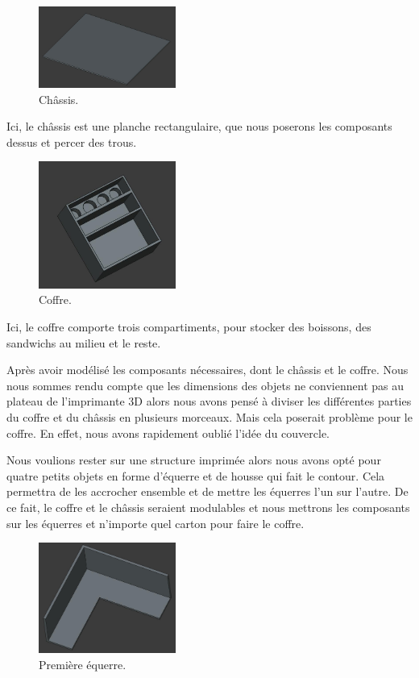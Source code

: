 \documentclass[a4paper,12pt]{report}  %
\begin{document}
\begin{figure}[H]
	\centering
	\includegraphics[width=0.4\textwidth]{./attachments/cad_planche.jpg}
	\caption{Châssis.}
\end{figure}

Ici, le châssis est une planche rectangulaire, que nous poserons les composants dessus et percer des trous.

\begin{figure}[H]
	\centering
	\includegraphics[width=0.4\textwidth]{./attachments/cad_coffre.jpg}
	\caption{Coffre.}
\end{figure}

Ici, le coffre comporte trois compartiments, pour stocker des boissons, des sandwichs au milieu et le reste.

Après avoir modélisé les composants nécessaires, dont le châssis et le coffre. Nous nous sommes rendu compte que les dimensions des objets ne conviennent pas au plateau de l’imprimante 3D alors nous avons pensé à diviser les différentes parties du coffre et du châssis en plusieurs morceaux. Mais cela poserait problème pour le coffre. En effet, nous avons rapidement oublié l’idée du couvercle.

Nous voulions rester sur une structure imprimée alors nous avons opté pour quatre petits objets en forme d'équerre et de housse qui fait le contour. Cela permettra de les accrocher ensemble et de mettre les équerres l’un sur l’autre. De ce fait, le coffre et le châssis seraient modulables et nous mettrons les composants sur les équerres et n’importe quel carton pour faire le coffre.

\begin{figure}[H]
	\centering
	\includegraphics[width=0.4\textwidth]{./attachments/cad_equerre.jpg}
	\caption{Première équerre.}
\end{figure}
\end{document}
